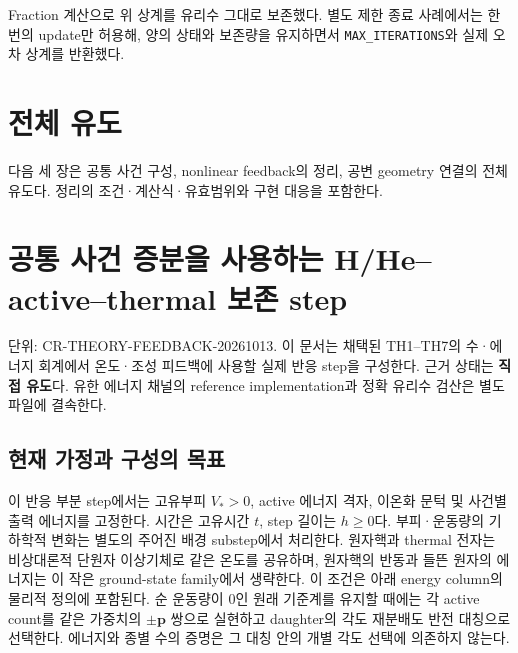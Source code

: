 \documentclass[11pt,a4paper]{article}
\begin{document}
Fraction 계산으로 위 상계를 유리수 그대로 보존했다. 별도 제한 종료 사례에서는 한 번의 update만 허용해, 양의 상태와 보존량을 유지하면서 \texttt{MAX\_ITERATIONS}와 실제 오차 상계를 반환했다.

\hypertarget{uxc804uxccb4-uxc720uxb3c4}{%
\section{전체 유도}\label{uxc804uxccb4-uxc720uxb3c4}}

다음 세 장은 공통 사건 구성, nonlinear feedback의 정리, 공변 geometry 연결의 전체 유도다. 정리의 조건·계산식·유효범위와 구현 대응을 포함한다.

\clearpage

\hypertarget{uxacf5uxd1b5-uxc0acuxac74-uxc99duxbd84uxc744-uxc0acuxc6a9uxd558uxb294-hheactivethermal-uxbcf4uxc874-step}{%
\section{공통 사건 증분을 사용하는 H/He--active--thermal 보존 step}\label{uxacf5uxd1b5-uxc0acuxac74-uxc99duxbd84uxc744-uxc0acuxc6a9uxd558uxb294-hheactivethermal-uxbcf4uxc874-step}}

단위: CR-THEORY-FEEDBACK-20261013. 이 문서는 채택된 TH1--TH7의 수·에너지 회계에서 온도·조성 피드백에 사용할 실제 반응 step을 구성한다. 근거 상태는 \textbf{직접 유도}다. 유한 에너지 채널의 reference implementation과 정확 유리수 검산은 별도 파일에 결속한다.

\hypertarget{uxd604uxc7ac-uxac00uxc815uxacfc-uxad6cuxc131uxc758-uxbaa9uxd45c}{%
\subsection{현재 가정과 구성의 목표}\label{uxd604uxc7ac-uxac00uxc815uxacfc-uxad6cuxc131uxc758-uxbaa9uxd45c}}

이 반응 부분 step에서는 고유부피 \(V_*>0\), active 에너지 격자, 이온화 문턱 및 사건별 출력 에너지를 고정한다. 시간은 고유시간 \(t\), step 길이는 \(h\ge0\)다. 부피·운동량의 기하학적 변화는 별도의 주어진 배경 substep에서 처리한다. 원자핵과 thermal 전자는 비상대론적 단원자 이상기체로 같은 온도를 공유하며, 원자핵의 반동과 들뜬 원자의 에너지는 이 작은 ground-state family에서 생략한다. 이 조건은 아래 energy column의 물리적 정의에 포함된다. 순 운동량이 0인 원래 기준계를 유지할 때에는 각 active count를 같은 가중치의 \(\pm\boldsymbol p\) 쌍으로 실현하고 daughter의 각도 재분배도 반전 대칭으로 선택한다. 에너지와 종별 수의 증명은 그 대칭 안의 개별 각도 선택에 의존하지 않는다.
\end{document}
